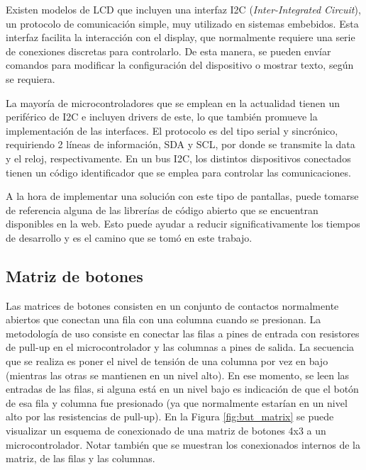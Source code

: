 
Existen modelos de LCD que incluyen una interfaz I2C (\textit{Inter-Integrated Circuit}), un protocolo de comunicación simple, muy utilizado en sistemas embebidos. Esta interfaz facilita la interacción con el display, que normalmente requiere una serie de conexiones discretas para controlarlo. De esta manera, se pueden envíar comandos para modificar la configuración del dispositivo o mostrar texto, según se requiera.

La mayoría de microcontroladores que se emplean en la actualidad tienen un periférico de I2C e incluyen drivers de este, lo que también promueve la implementación de las interfaces. El protocolo es del tipo serial y sincrónico, requiriendo 2 líneas de información, SDA y SCL, por donde se transmite la data y el reloj, respectivamente. En un bus I2C, los distintos dispositivos conectados tienen un código identificador que se emplea para controlar las comunicaciones.

A la hora de implementar una solución con este tipo de pantallas, puede tomarse de referencia alguna de las librerías de código abierto que se encuentran disponibles en la web. Esto puede ayudar a reducir significativamente los tiempos de desarrollo y es el camino que se tomó en este trabajo.

\subsection{Matriz de botones}

Las matrices de botones consisten en un conjunto de contactos normalmente abiertos que conectan una fila con una columna cuando se presionan. La metodología de uso consiste en conectar las filas a pines de entrada con resistores de pull-up en el microcontrolador y las columnas a pines de salida. La secuencia que se realiza es poner el nivel de tensión de una columna por vez en bajo (mientras las otras se mantienen en un nivel alto). En ese momento, se leen las entradas de las filas, si alguna está en un nivel bajo es indicación de que el botón de esa fila y columna fue presionado (ya que normalmente estarían en un nivel alto por las resistencias de pull-up)\citep{Arduino_Cookbook}. En la Figura \ref{fig:but_matrix} se puede visualizar un esquema de conexionado de una matriz de botones 4x3 a un microcontrolador. Notar también que se muestran los conexionados internos de la matriz, de las filas y las columnas.

